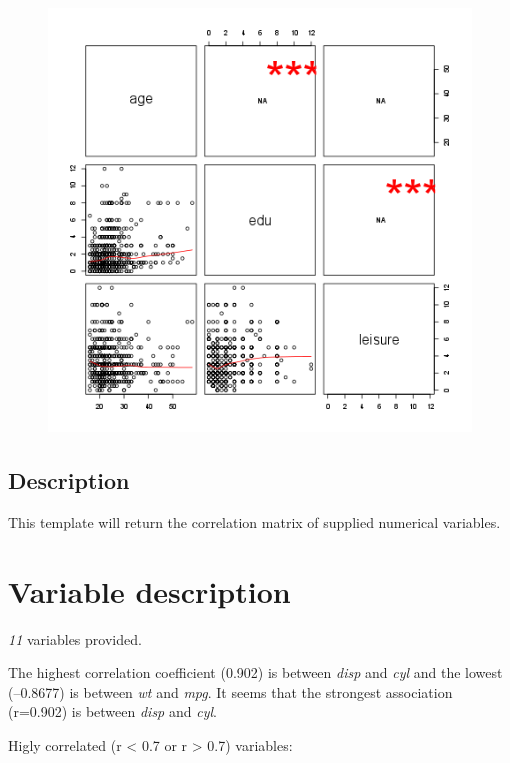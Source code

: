 \documentclass{article}
\makeatletter
\def\maxwidth{\ifdim\Gin@nat@width>\linewidth\linewidth
\else\Gin@nat@width\fi}
\let\Oldincludegraphics\includegraphics
\renewcommand{\includegraphics}[1]{\Oldincludegraphics[width=\maxwidth]{#1}}
\makeatother
\begin{document}
\begin{figure}[htbp]
\centering
\includegraphics{fc8b6edbaddadbdf0c5014f99fda88d6.png}
\caption{}
\end{figure}

\subsection{Description}

This template will return the correlation matrix of supplied numerical
variables.

\section{Variable description}

\emph{11} variables provided.

The highest correlation coefficient (0.902) is between \emph{disp} and
\emph{cyl} and the lowest (--0.8677) is between \emph{wt} and
\emph{mpg}. It seems that the strongest association (r=0.902) is between
\emph{disp} and \emph{cyl}.

Higly correlated (r \textless{} 0.7 or r \textgreater{} 0.7) variables:
\end{document}
